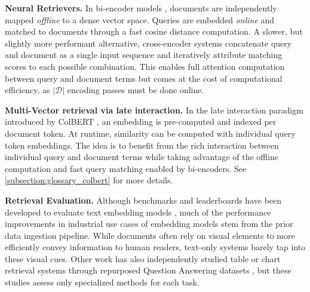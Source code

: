 \noindent\textbf{Neural Retrievers.}
In bi-encoder models , documents are independently mapped \textit{offline} to a dense vector space. Queries are embedded \textit{online} and matched to documents through a fast cosine distance computation.
A slower, but slightly more performant alternative, cross-encoder systems  concatenate query and document as a single input sequence and iteratively attribute matching scores to each possible combination. This enables full attention computation between query and document terms but comes at the cost of computational efficiency, as $|\mathcal{D}|$ encoding passes must be done online.


\noindent\textbf{Multi-Vector retrieval via late interaction.}
In the late interaction paradigm introduced by ColBERT , an embedding is pre-computed and indexed per document token. At runtime, similarity can be computed with individual query token embeddings. The idea is to benefit from the rich interaction between individual query and document terms while taking advantage of the offline computation and fast query matching enabled by bi-encoders. See \autoref{subsection:glossary_colbert} for more details.



\noindent\textbf{Retrieval Evaluation.}
Although benchmarks and leaderboards have been developed to evaluate text embedding models , much of the performance improvements in industrial use cases of embedding models stem from the prior data ingestion pipeline. While documents often rely on visual elements to more efficiently convey information to human readers, text-only systems barely tap into these visual cues. Other work has also independently studied table or chart retrieval systems through repurposed Question Answering datasets , but these studies assess only specialized methods for each task.

